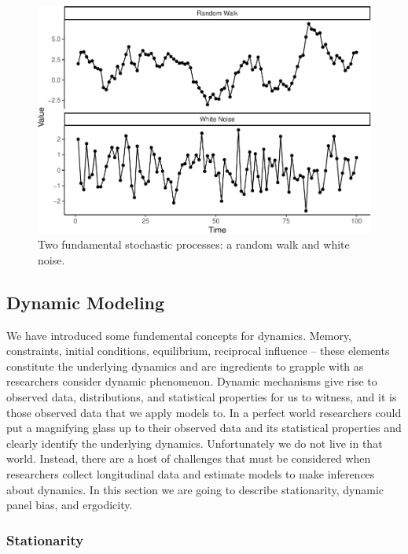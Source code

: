 \documentclass[english,,man]{apa6}
\theoremstyle{definition}
\theoremstyle{definition}
\theoremstyle{definition}
\theoremstyle{remark}
\begin{document}
\begin{figure}
\centering
\includegraphics{figs/unnamed-chunk-10-1.pdf}
\caption{\label{fig:unnamed-chunk-10}Two fundamental stochastic processes: a
random walk and white noise.\label{noise}}
\end{figure}

\hypertarget{dynamic-modeling}{%
\subsection{Dynamic Modeling}\label{dynamic-modeling}}

We have introduced some fundemental concepts for dynamics. Memory,
constraints, initial conditions, equilibrium, reciprocal influence --
these elements constitute the underlying dynamics and are ingredients to
grapple with as researchers consider dynamic phenomenon. Dynamic
mechanisms give rise to observed data, distributions, and statistical
properties for us to witness, and it is those observed data that we
apply models to. In a perfect world researchers could put a magnifying
glass up to their observed data and its statistical properties and
clearly identify the underlying dynamics. Unfortunately we do not live
in that world. Instead, there are a host of challenges that must be
considered when researchers collect longitudinal data and estimate
models to make inferences about dynamics. In this section we are going
to describe stationarity, dynamic panel bias, and ergodicity.

\hypertarget{stationarity}{%
\subsubsection{Stationarity}\label{stationarity}}
\end{document}
